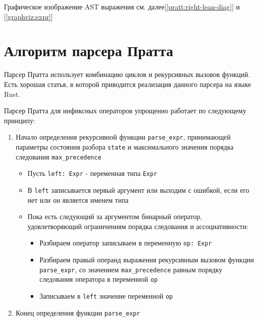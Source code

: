 Графическое изображение AST выражения см. далее[\ref{pratt:right-lean-diag}] и [\ref{graphviz:expr}]

\section{Алгоритм парсера Пратта}
\label{pass:parsing:pratt}

Парсер Пратта использует комбинацию циклов и рекурсивных вызовов функций.
Есть хорошая статья, в которой приводится реализация данного парсера на языке Rust\cite{matklad_pratt_parsers}.

Парсер Пратта для инфиксных операторов упрощенно работает по следующему принципу: 

    

\begin{enumerate}
    \item Начало определения рекурсивной функции \verb|parse_expr|, 
    принимающей параметры состояния разбора \verb|state| и максимального значения порядка следования \verb|max_precedence|

    \begin{itemize}
        \item Пусть \verb|left: Expr| - переменная типа \verb|Expr|

        \item В \verb|left| записывается первый аргумент или выходим с ошибкой, если его нет или он является именем типа

        \item\label{pratt:alg:loop} Пока есть следующий за аргументом бинарный оператор, удовлетворяющий ограничениям порядка следования и ассоциативности:

        \begin{itemize}
            \item Разбираем оператор записываем в переменную \verb|op: Expr|

            \item\label{pratt:alg:rec-call} Разбираем правый операнд выражения рекурсивным вызовом функции \verb|parse_expr|, 
            со значением \verb|max_precedence| равным порядку следования оператора в переменной \verb|op|

            \item Записываем в \verb|left| значение переменной \verb|op|
        \end{itemize}
    \end{itemize}

    \item Конец определения функции \verb|parse_expr|
\end{enumerate}


